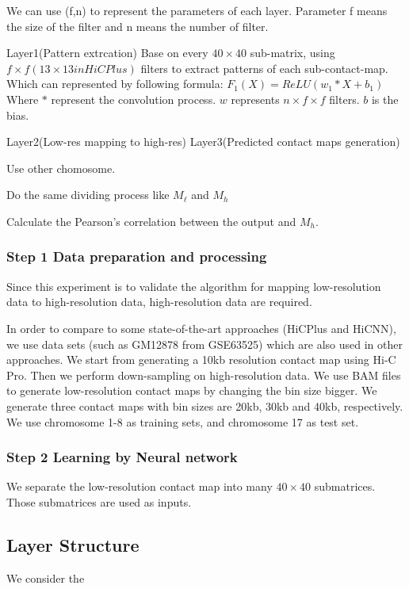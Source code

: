 \documentclass{article}
\begin{document}
We can use (f,n) to represent the parameters of each layer. Parameter f means the size of the filter and n means the number of filter. 

Layer1(Pattern extrcation)
Base on every $40 \times 40$ sub-matrix, using $f \times f(13 \times 13 in HiCPlus)$ filters
to extract patterns of each sub-contact-map. Which can represented by following formula:
$F_1(X) = ReLU(w_1 * X + b_1)$
Where $*$ represent the convolution process. $w$ represents $n \times f \times f$ filters. 
$b$ is the bias.
 
Layer2(Low-res mapping to high-res)
Layer3(Predicted contact maps generation)


Use other chomosome. 

Do the same dividing process like $M_\ell$ and $M_h$

Calculate the Pearson's correlation between the output and $M_h$.







\subsubsection*{Step 1 Data preparation and processing}
Since this experiment is to validate the algorithm for mapping low-resolution data to high-resolution data, 
high-resolution data are required. 

In order to compare to some state-of-the-art approaches (HiCPlus and HiCNN), 
we use data sets (such as GM12878 from GSE63525) which are also used in other approaches. 
We start from generating a 10kb resolution contact map 
using Hi-C Pro. 
Then we perform down-sampling on high-resolution data. 
We use BAM files to generate low-resolution contact maps by changing the bin size bigger. 
We generate three contact maps with bin sizes are 20kb, 30kb and 40kb, respectively. 
We use chromosome 1-8 as training sets, and chromosome 17 as test set.

\subsubsection*{Step 2 Learning by Neural network}
We separate the low-resolution contact map into many $40 \times 40$ submatrices. 
Those submatrices are used as inputs.

\subsection{Layer Structure}
We consider the 





 
\end{document}
